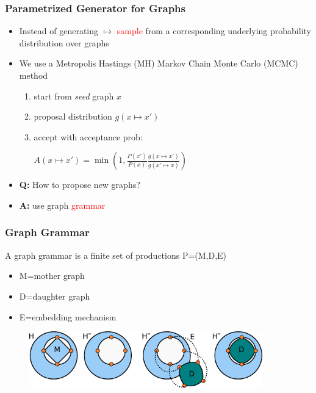 \documentclass{beamer}
\newcommand{\red}[1]{\textcolor{red}{#1}}
\begin{document}
\begin{frame}
    \frametitle{Parametrized Generator for Graphs}
    \begin{itemize}
        \item Instead of generating $\mapsto$ \red{sample} from a corresponding underlying probability distribution over graphs
        \item We use a Metropolis Hastings (MH) Markov Chain Monte Carlo (MCMC) method
        \begin{enumerate}
            \item start from {\em seed} graph $x$
            \item proposal distribution $g(x \mapsto x')$
            \item accept with acceptance prob: \\
            \begin{center}
            $A(x \mapsto x')=\min(1, \frac{P(x')}{P(x)} \frac{g(x \mapsto x')}{g(x' \mapsto x)})$
            \end{center}
        \end{enumerate}
        \item {\bf Q:} How to propose new graphs?
        \item {\bf A:} use graph \red{grammar}
    \end{itemize}
\end{frame}

\begin{frame}
    \frametitle{Graph Grammar}
    A graph grammar is a finite set of productions P=(M,D,E) 
    \begin{itemize}
        \item M=mother graph
        \item D=daughter graph
        \item E=embedding mechanism
    \end{itemize}
    \begin{figure}[ht]
        \centering
        \includegraphics[width=0.9\textwidth]{images/grammar.pdf}
    \end{figure}
\end{frame}
\end{document}
